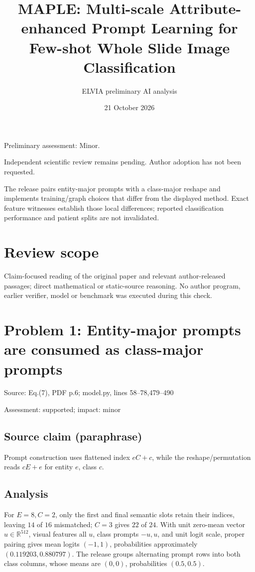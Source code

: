 \documentclass[11pt]{article}
\begin{document}
\title{MAPLE: Multi-scale Attribute-enhanced Prompt Learning for Few-shot Whole Slide Image Classification}

\author{ELVIA preliminary AI analysis}\date{21 October 2026}\maketitle

Preliminary assessment: Minor.\par

Independent scientific review remains pending. Author adoption has not been requested.

The release pairs entity-major prompts with a class-major reshape and implements training/graph choices that differ from the displayed method. Exact feature witnesses establish those local differences; reported classification performance and patient splits are not invalidated.

\section*{Review scope}

Claim-focused reading of the original paper and relevant author-released passages; direct mathematical or static-source reasoning. No author program, earlier verifier, model or benchmark was executed during this check.

\section*{Problem 1: Entity-major prompts are consumed as class-major prompts}

Source: Eq.(7), PDF p.6; model.py, lines 58–78,479–490

Assessment: supported; impact: minor

\subsection*{Source claim (paraphrase)}

Prompt construction uses flattened index \(eC+c\), while the reshape/permutation reads \(cE+e\) for entity \(e\), class \(c\).

\subsection*{Analysis}

For \(E=8,C=2\), only the first and final semantic slots retain their indices, leaving \(14\) of \(16\) mismatched; \(C=3\) gives \(22\) of \(24\). With unit zero-mean vector \(u\in\mathbb R^{512}\), visual features all \(u\), class prompts \(-u,u\), and unit logit scale, proper pairing gives mean logits \((-1,1)\), probabilities approximately \((0.119203,0.880797)\). The release groups alternating prompt rows into both class columns, whose means are \((0,0)\), probabilities \((0.5,0.5)\).
\end{document}
